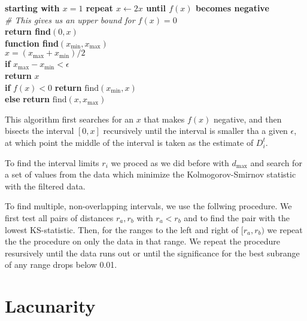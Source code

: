 \documentclass[11pt]{article}
\begin{document}
\begin{pseudo}[h]
	\textbf{starting with $x = 1$ repeat $x \leftarrow 2x$ until $f(x)$ becomes negative}  \\
	\hspace*{5mm}\textit{\# This gives us an upper bound for $f(x) = 0$}\\
	\textbf{return find}$(0, x)$ \\
	
	\textbf{function find}$(x_{\min}, x_{\max})$ \\
	\hspace*{5mm} $x = (x_{\max} + x_{\min})/2$ \\
	\hspace*{5mm} \textbf{if} $x_{\max} - x_{\min} < \epsilon$ \\
	\hspace*{10mm} \textbf{return} $x$\\
	\hspace*{5mm} \textbf{if} $f(x) < 0$
	\textbf{return} $\mbox{find}(x_{\min}, x)$ \\ 
	\hspace*{5mm} \textbf{else} 
 	\textbf{return} $\mbox{find}(x, x_{\max})$ \\	
\end{pseudo}

This algorithm first searches for an $x$ that makes $f(x)$ negative, and then bisects the interval $[0, x]$ recursively until the interval is smaller tha a given $\epsilon$, at which point the middle of the interval is taken as the estimate of $D_i^t$.

To find the interval limits $r_i$ we proced as we did before with $d_{\max}$ and search for a set of values from the data which minimize the Kolmogorov-Smirnov statistic with the filtered data.

To find multiple, non-overlapping intervals, we use the follwing procedure. We first test all pairs of distances $r_a, r_b$ with $r_a < r_b$ and to find the pair with the lowest KS-statistic. Then, for the ranges to the left and right of $[r_a, r_b)$ we repeat the the procedure on only the data in that range. We repeat the procedure resursively until the data runs out or until the significance for the best subrange of any range drops below 0.01.

\section{Lacunarity}
\end{document}
